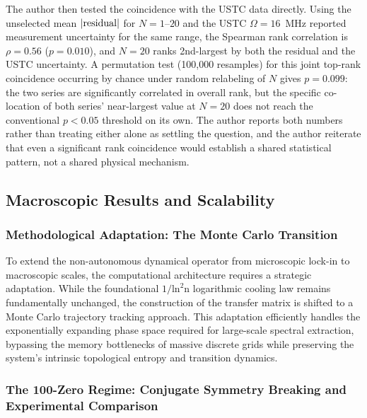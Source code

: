 \documentclass[mca,article,submit,oneauthor,pdftex]{Definitions/mdpi}
\begin{document}
The author then tested the coincidence with the USTC data directly. Using the
unselected mean $|{\rm residual}|$ for $N=1$--$20$ and the USTC
$\Omega=16$~MHz reported measurement uncertainty for the same range, the
Spearman rank correlation is $\rho=0.56$ ($p=0.010$), and $N=20$ ranks
2nd-largest by both the residual and the USTC uncertainty. A permutation
test (100{,}000 resamples) for this joint top-rank coincidence occurring
by chance under random relabeling of $N$ gives $p=0.099$: the two series
are significantly correlated in overall rank, but the specific
co-location of both series' near-largest value at $N=20$ does not reach
the conventional $p<0.05$ threshold on its own. The author reports both numbers
rather than treating either alone as settling the question, and the author
reiterate that even a significant rank coincidence would establish a
shared statistical pattern, not a shared physical mechanism.

\subsection{Macroscopic Results and Scalability}

\subsubsection{Methodological Adaptation: The Monte Carlo Transition}

To extend the non-autonomous dynamical operator from microscopic lock-in
to macroscopic scales, the computational architecture requires a
strategic adaptation. While the foundational
\(\text{1/}\text{ln}^{\text{2}}\text{n}\) logarithmic cooling law
remains fundamentally unchanged, the construction of the transfer matrix
is shifted to a Monte Carlo trajectory tracking approach. This
adaptation efficiently handles the exponentially expanding phase space
required for large-scale spectral extraction, bypassing the memory
bottlenecks of massive discrete grids while preserving the system's
intrinsic topological entropy and transition dynamics.

\subsubsection{The 100-Zero Regime: Conjugate Symmetry Breaking and Experimental Comparison}\label{sec:conjugate-ablation}
\end{document}
